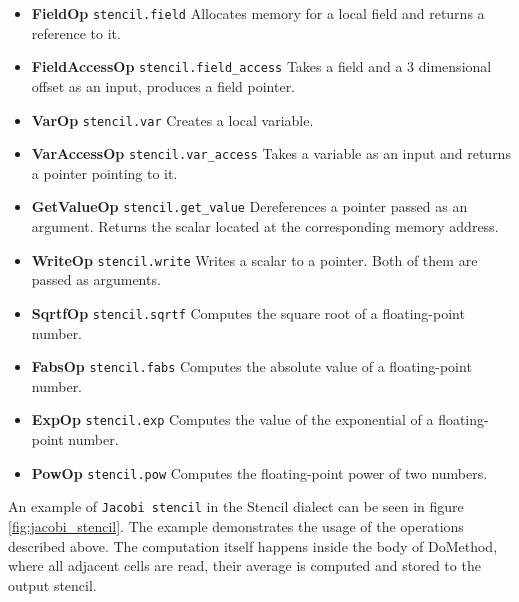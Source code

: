 \documentclass[sigplan,\review anonymous]{acmart}
\begin{document}
\begin{itemize}
  \item \textbf{FieldOp} \texttt{stencil.field} Allocates memory for a local
  field and returns a reference to it.
  \item \textbf{FieldAccessOp} \texttt{stencil.field\_access} Takes a field
  and a 3 dimensional offset as an input, produces a field pointer.
  \item \textbf{VarOp} \texttt{stencil.var} Creates a local variable.
  \item \textbf{VarAccessOp} \texttt{stencil.var\_access} Takes a variable
  as an input and returns a pointer pointing to it.
  \item \textbf{GetValueOp} \texttt{stencil.get\_value} Dereferences a pointer
  passed as an argument. Returns the scalar located at the corresponding memory
  address.
  \item \textbf{WriteOp} \texttt{stencil.write} Writes a scalar to a pointer.
  Both of them are passed as arguments.
  \item \textbf{SqrtfOp} \texttt{stencil.sqrtf} Computes the square root of a
  floating-point number.
  \item \textbf{FabsOp} \texttt{stencil.fabs} Computes the absolute value of
  a floating-point number.
  \item \textbf{ExpOp} \texttt{stencil.exp} Computes the value of the
  exponential of a floating-point number.
  \item \textbf{PowOp} \texttt{stencil.pow} Computes the floating-point power
  of two numbers.
\end{itemize}

\noindent An example of \texttt{Jacobi stencil} in the Stencil dialect can be
seen in figure \ref{fig:jacobi_stencil}. The example demonstrates the usage of
the operations described above. The computation itself happens inside the body
of DoMethod, where all adjacent cells are read, their average is computed and
stored to the output stencil. 
\end{document}
